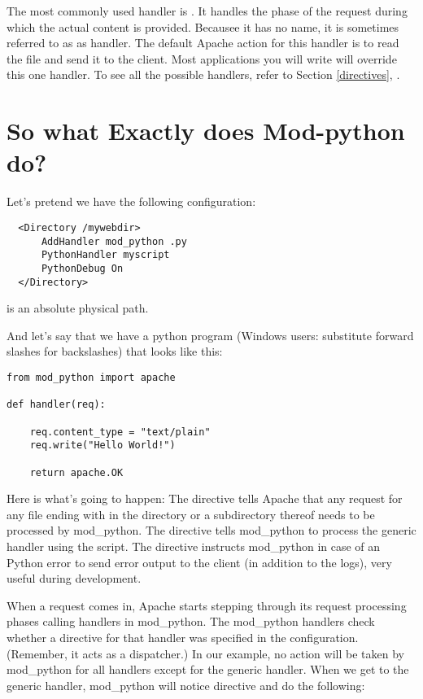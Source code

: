 The most commonly used handler is . It handles the
phase of the request during which the actual content is
provided. Becausee it has no name, it is sometimes referred to as as
 handler. The default Apache action for this handler is
to read the file and send it to the client. Most applications you will
write will override this one handler. To see all the possible
handlers, refer to Section \ref{directives},
.

\section{So what Exactly does Mod-python do?\label{tut-what-it-do}}

Let's pretend we have the following configuration: 
\begin{verbatim}
  <Directory /mywebdir>
      AddHandler mod_python .py
      PythonHandler myscript
      PythonDebug On
  </Directory>
\end{verbatim}

  is an absolute physical path. 

And let's say that we have a python program (Windows users: substitute
forward slashes for backslashes)  that looks like
this:

\begin{verbatim}
from mod_python import apache

def handler(req):

    req.content_type = "text/plain"
    req.write("Hello World!")

    return apache.OK
\end{verbatim}    

Here is what's going to happen: The  directive tells
Apache that any request for any file ending with  in the
 directory or a subdirectory thereof needs to be
processed by mod_python. The  directive
tells mod_python to process the generic handler using the
 script. The  directive instructs
mod_python in case of an Python error to send error output to the
client (in addition to the logs), very useful during development.

When a request comes in, Apache starts stepping through its request
processing phases calling handlers in mod_python. The mod_python
handlers check whether a directive for that handler was specified in
the configuration. (Remember, it acts as a dispatcher.)  In our
example, no action will be taken by mod_python for all handlers except
for the generic handler. When we get to the generic handler,
mod_python will notice  directive and do
the following:

